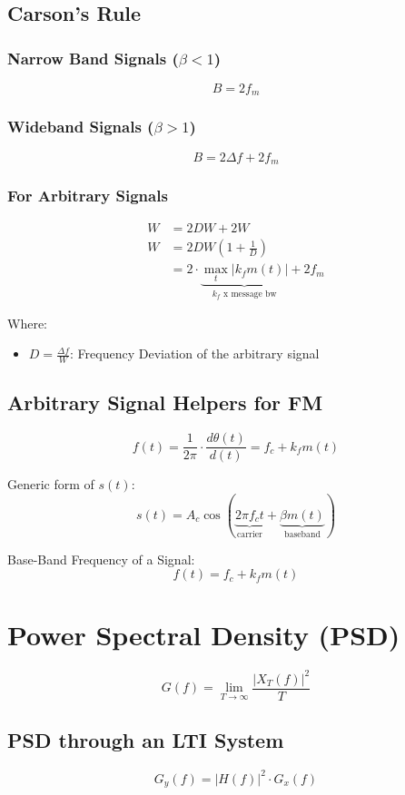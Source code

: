\documentclass[10pt]{article}
\begin{document}
\subsection{Carson's Rule}
\subsubsection{Narrow Band Signals ($\beta < 1$)}
\[
	B = 2 f_m
\]

\subsubsection{Wideband Signals ($\beta > 1$)}
\[
	B = 2 \Delta f + 2 f_m
\]
\subsubsection{For Arbitrary Signals}
\begin{align*}
	W & = 2 D W + 2 W                                                                            \\
	W & = 2DW(1 + \frac{1}{D})                                                                   \\
	  & = 2 \cdot \underbrace{\max_{t}\left|k_f m(t)\right|}_{\text{$k_f$ x message bw}} + 2 f_m
\end{align*}

\noindent Where:
\begin{itemize}
	\item $D = \frac{\Delta f}{W} $: Frequency Deviation of the arbitrary signal
\end{itemize}

\subsection{Arbitrary Signal Helpers for FM}
\[
	f(t) = \frac{1}{2\pi} \cdot \frac{d\theta(t)}{d(t)} = f_c + k_f m(t)
\]

Generic form of $s(t)$:
\[
	s(t) = A_c\cos(\underbrace{2 \pi f_c t}_{\text{carrier}} + \underbrace{\beta m(t)}_{\text{baseband}})
\]

Base-Band Frequency of a Signal:
\[
	f(t) = f_c + k_f m(t)
\]

\section{Power Spectral Density (PSD)}
\[
	G(f) = \lim_{T \to \infty} \frac{|X_T(f)|^2}{T}
\]

\subsection{PSD through an LTI System}
\[
    G_y(f) = \left|H(f)\right|^2 \cdot G_x(f)
\]
\end{document}
